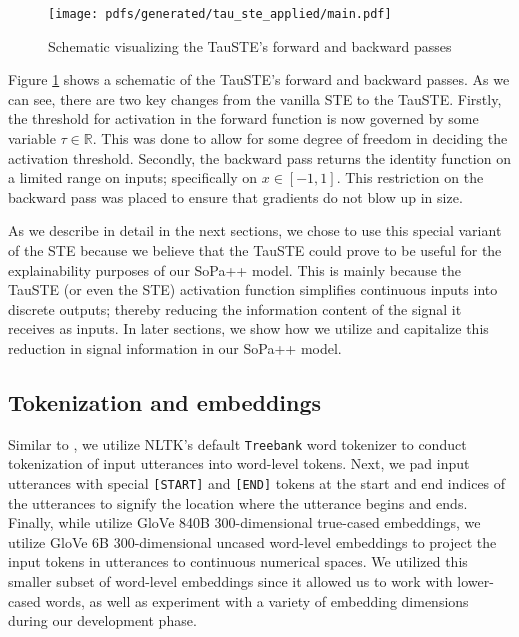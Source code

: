 \begin{figure}[t!]
  \centering
  \texttt{[image: pdfs/generated/tau\_ste\_applied/main.pdf]}
  \caption{Schematic visualizing the TauSTE's forward and backward passes}
  \label{fig:tau_ste}
\end{figure}

Figure \ref{fig:tau_ste} shows a schematic of the TauSTE's forward and backward
passes. As we can see, there are two key changes from the vanilla STE to the
TauSTE. Firstly, the threshold for activation in the forward function is now
governed by some variable $\tau \in \mathbb{R}$. This was done to allow for some
degree of freedom in deciding the activation threshold. Secondly, the backward
pass returns the identity function on a limited range on inputs; specifically on
$x \in [-1,1]$. This restriction on the backward pass was placed to ensure that
gradients do not blow up in size.

As we describe in detail in the next sections, we chose to use this special
variant of the STE because we believe that the TauSTE could prove to be useful
for the explainability purposes of our SoPa++ model. This is mainly because the
TauSTE (or even the STE) activation function simplifies continuous inputs into
discrete outputs; thereby reducing the information content of the signal it
receives as inputs. In later sections, we show how we utilize and capitalize
this reduction in signal information in our SoPa++ model.

\subsection{Tokenization and embeddings}

Similar to \citet{schwartz2018sopa}, we utilize NLTK's default \texttt{Treebank}
word tokenizer \citep{bird-loper-2004-nltk} to conduct tokenization of input
utterances into word-level tokens. Next, we pad input utterances with special
\texttt{[START]} and \texttt{[END]} tokens at the start and end indices of the
utterances to signify the location where the utterance begins and ends. Finally,
while \citet{schwartz2018sopa} utilize GloVe 840B 300-dimensional true-cased
embeddings, we utilize GloVe 6B 300-dimensional uncased word-level embeddings
\citep{pennington2014glove} to project the input tokens in utterances to
continuous numerical spaces. We utilized this smaller subset of word-level
embeddings since it allowed us to work with lower-cased words, as well as
experiment with a variety of embedding dimensions during our development phase.


